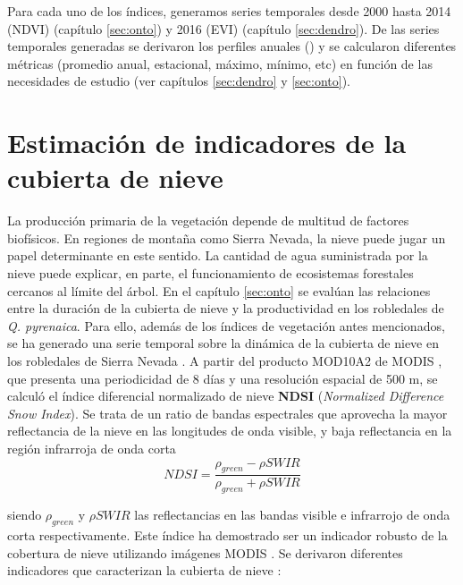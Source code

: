 Para cada uno de los índices, generamos series temporales desde 2000 hasta 2014 (NDVI) (capítulo \ref{sec:onto}) y 2016 (EVI) (capítulo \ref{sec:dendro}). De las series temporales generadas se derivaron los perfiles anuales () y se calcularon diferentes métricas (promedio anual, estacional, máximo, mínimo, etc) en función de las necesidades de estudio (ver capítulos \ref{sec:dendro} y \ref{sec:onto}). 

\section{Estimación de indicadores de la cubierta de nieve}\label{sec:metodologia:modis-nieve}
La producción primaria de la vegetación depende de multitud de factores biofísicos. En regiones de montaña como Sierra Nevada, la nieve puede jugar un papel determinante en este sentido. La cantidad de agua suministrada por la nieve puede explicar, en parte, el funcionamiento de ecosistemas forestales cercanos al límite del árbol. En el capítulo \ref{sec:onto} se evalúan las relaciones entre la duración de la cubierta de nieve y la productividad en los robledales de \emph{Q. pyrenaica}. Para ello, además de los índices de vegetación antes mencionados, se ha generado una serie temporal sobre la dinámica de la cubierta de nieve en
los robledales de Sierra Nevada \autocites{PerezLuqueetal2016TemporalTrend,BonetGarciaetal2015AnalisisTendencias}. A partir del producto MOD10A2 de MODIS \autocites{Halletal2002MODISSnowcover}, que presenta una periodicidad de 8 días y una resolución espacial de 500 m, se calculó el índice diferencial normalizado de nieve \textbf{NDSI} (\emph{Normalized Difference Snow Index}). Se trata de un ratio de bandas espectrales que aprovecha la mayor reflectancia de la nieve en las longitudes de onda visible, y baja reflectancia en la región infrarroja de onda corta
\autocites{SalomonsonAppel2006DevelopmentAqua} \[NDSI = \frac{\rho_{green} - \rho{SWIR}}{\rho_{green} + \rho{SWIR}}\]

siendo \(\rho_{green}\) y \(\rho{SWIR}\) las reflectancias en las bandas visible e infrarrojo de onda corta respectivamente. Este índice ha demostrado ser un indicador robusto de la cobertura de nieve utilizando
imágenes MODIS \autocites{Rittgeretal2013AssessmentMethods}. Se derivaron diferentes indicadores que caracterizan la cubierta de nieve \autocites{WangXie2009NewMethods}: 

